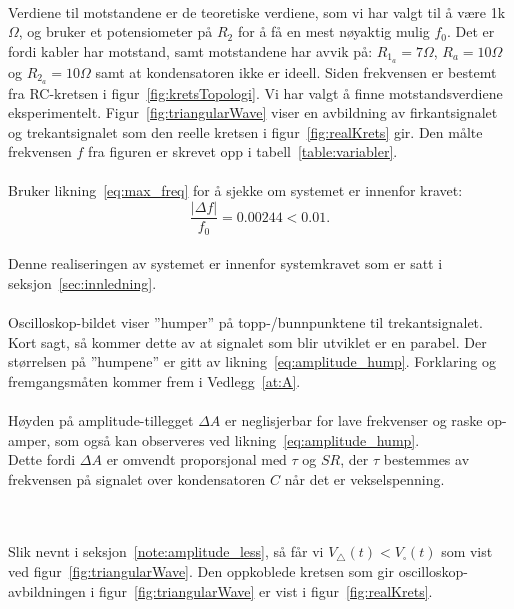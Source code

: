 \documentclass[a4paper,11pt,norsk]{article}
\begin{document}
\\
\newpage
Verdiene til motstandene er de teoretiske verdiene, som vi har valgt til å være 1k$\Omega$, og bruker et potensiometer på $R_2$ for å få en mest nøyaktig mulig $f_0$. Det er fordi kabler har motstand, samt motstandene har avvik på: $R_{1_a} = 7\Omega$, $R_{a} = 10\Omega$ og $R_{2_a} = 10\Omega$ samt at kondensatoren ikke er ideell. Siden frekvensen er bestemt fra RC-kretsen i figur~\ref{fig:kretsTopologi}. Vi har valgt å finne motstandsverdiene eksperimentelt.
Figur~\ref{fig:triangularWave} viser en avbildning av firkantsignalet og trekantsignalet som den reelle kretsen i figur~\ref{fig:realKrets} gir. Den målte frekvensen $f$ fra figuren er skrevet opp i tabell~\ref{table:variabler}.
\\\\
Bruker likning~\ref{eq:max_freq} for å sjekke om systemet er innenfor kravet:
\\
\begin{equation}
    \frac{|\Delta f|}{f_0} = 0.00244 < 0.01 \textit{.}
    \label{eq:systemkrav_godkjent}
\end{equation}
\\
Denne realiseringen av systemet er innenfor systemkravet som er satt i seksjon~\ref{sec:innledning}.
\\\\
Oscilloskop-bildet viser ''humper'' på topp-/bunnpunktene til trekantsignalet. \\
Kort sagt, så kommer dette av at signalet som blir utviklet er en parabel. Der størrelsen på ''humpene'' er gitt av likning~\ref{eq:amplitude_hump}. 
Forklaring og fremgangsmåten kommer frem i Vedlegg~\ref{at:A}.
\\\\
Høyden på amplitude-tillegget $\Delta A$ er neglisjerbar for lave frekvenser og raske op-amper, som også kan observeres ved likning~\ref{eq:amplitude_hump}. \\
Dette fordi $\Delta A$ er omvendt proporsjonal med $\tau$ og $SR$, der $\tau$ bestemmes av frekvensen på signalet over kondensatoren $C$ når det er vekselspenning.

\\\\
Slik nevnt i seksjon~\ref{note:amplitude_less}, 
så får vi $V_\triangle(t) < V_\square(t)$ som vist ved figur~\ref{fig:triangularWave}.
\newpage
Den oppkoblede kretsen som gir oscilloskop-avbildningen i figur~\ref{fig:triangularWave} er vist i figur~\ref{fig:realKrets}.
\end{document}
